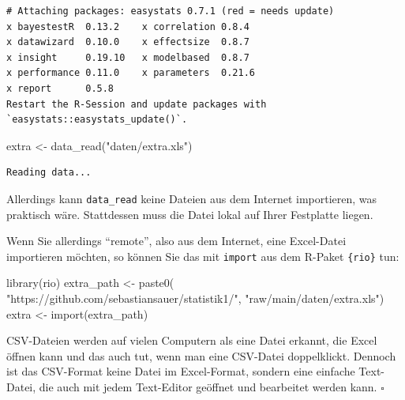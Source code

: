 \documentclass[
  letterpaper,
  DIV=11,
  numbers=noendperiod]{scrartcl}
\newenvironment{Shaded}{\begin{snugshade}}{\end{snugshade}}
\newcommand{\FunctionTok}[1]{\textcolor[rgb]{0.28,0.35,0.67}{#1}}
\newcommand{\NormalTok}[1]{\textcolor[rgb]{0.00,0.23,0.31}{#1}}
\newcommand{\OtherTok}[1]{\textcolor[rgb]{0.00,0.23,0.31}{#1}}
\newcommand{\StringTok}[1]{\textcolor[rgb]{0.13,0.47,0.30}{#1}}
\theoremstyle{definition}
\theoremstyle{definition}
\theoremstyle{definition}
\theoremstyle{remark}
\begin{document}
\begin{verbatim}
# Attaching packages: easystats 0.7.1 (red = needs update)
x bayestestR  0.13.2    x correlation 0.8.4  
x datawizard  0.10.0    x effectsize  0.8.7  
x insight     0.19.10   x modelbased  0.8.7  
x performance 0.11.0    x parameters  0.21.6 
x report      0.5.8     
Restart the R-Session and update packages with `easystats::easystats_update()`.
\end{verbatim}

\begin{Shaded}
\begin{Highlighting}[]
\NormalTok{extra }\OtherTok{\textless{}{-}} \FunctionTok{data\_read}\NormalTok{(}\StringTok{"daten/extra.xls"}\NormalTok{)}
\end{Highlighting}
\end{Shaded}

\begin{verbatim}
Reading data...
\end{verbatim}

Allerdings kann \texttt{data\_read} keine Dateien aus dem Internet
importieren, was praktisch wäre. Stattdessen muss die Datei lokal auf
Ihrer Festplatte liegen.

Wenn Sie allerdings ``remote'', also aus dem Internet, eine Excel-Datei
importieren möchten, so können Sie das mit \texttt{import} aus dem
R-Paket \texttt{\{rio\}} tun:

\begin{Shaded}
\begin{Highlighting}[]
\FunctionTok{library}\NormalTok{(rio)}
\NormalTok{extra\_path }\OtherTok{\textless{}{-}} \FunctionTok{paste0}\NormalTok{(}
  \StringTok{"https://github.com/sebastiansauer/statistik1/"}\NormalTok{,}
  \StringTok{"raw/main/daten/extra.xls"}\NormalTok{)}
\NormalTok{extra }\OtherTok{\textless{}{-}} \FunctionTok{import}\NormalTok{(extra\_path)}
\end{Highlighting}
\end{Shaded}

\begin{tcolorbox}[enhanced jigsaw, coltitle=black, colframe=quarto-callout-note-color-frame, opacityback=0, toprule=.15mm, opacitybacktitle=0.6, arc=.35mm, titlerule=0mm, toptitle=1mm, title=\textcolor{quarto-callout-note-color}{\faInfo}\hspace{0.5em}{Note}, bottomtitle=1mm, leftrule=.75mm, breakable, rightrule=.15mm, colbacktitle=quarto-callout-note-color!10!white, bottomrule=.15mm, colback=white, left=2mm]

CSV-Dateien werden auf vielen Computern als eine Datei erkannt, die
Excel öffnen kann und das auch tut, wenn man eine CSV-Datei
doppelklickt. Dennoch ist das CSV-Format keine Datei im Excel-Format,
sondern eine einfache Text-Datei, die auch mit jedem Text-Editor
geöffnet und bearbeitet werden kann. \(\square\)

\end{tcolorbox}
\end{document}

